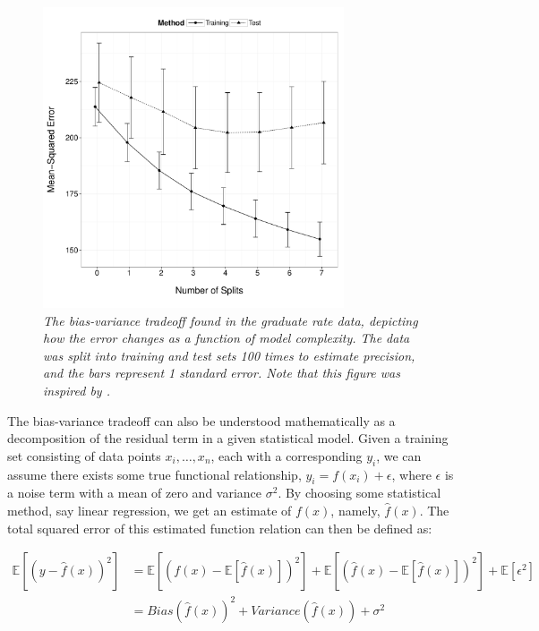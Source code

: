 \begin{figure}[h]
  \centering
  \includegraphics[width=3.5in]{Figures/Chapter02/bias_var_plot.pdf}
  \caption[The bias-variance tradeoff in the graduation rate data.]{\textit{The bias-variance tradeoff found in the graduate rate data, depicting how the error changes as a function of model complexity. The data was split into training and test sets 100 times to estimate precision, and the bars represent 1 standard error. Note that this figure was inspired by \cite{james2013introduction}.}}
  \label{fig:tradeoff}
\end{figure}


	The bias-variance tradeoff can also be understood mathematically as a decomposition of the residual term in a given statistical model. Given a training set consisting of data points $x_i, \ldots, x_n$, each with a corresponding $y_i$, we can assume there exists some true functional relationship, $y_i = f(x_i) + \epsilon$, where $\epsilon$ is a noise term with a mean of zero and variance $\sigma^2$. By choosing some statistical method, say linear regression, we get an estimate of $f(x)$, namely, $\hat{f}(x)$. The total squared error of this estimated function relation can then be defined as:

\begin{equation}
\begin{aligned}
\mathbb{E}[(y - \hat{f}(x))^2] &= \mathbb{E}[(f(x) - \mathbb{E}[\hat{f}(x)])^2] + \mathbb{E}[(\hat{f}(x) - \mathbb{E}[\hat{f}(x)])^2] + \mathbb{E}[\epsilon^2] \\
&= Bias(\hat{f}(x))^2 + Variance(\hat{f}(x)) + \sigma^2
\end{aligned}
\end{equation}


